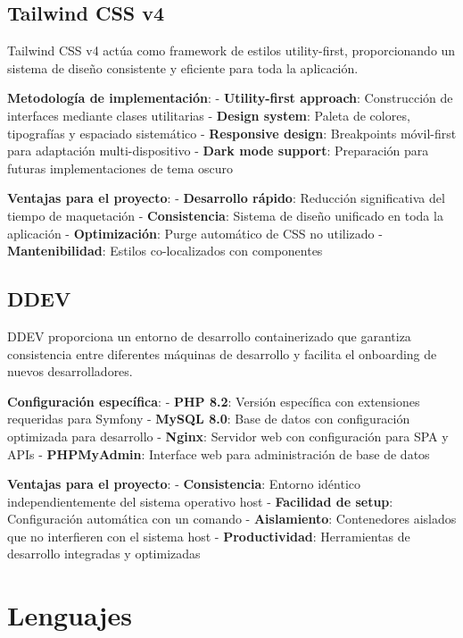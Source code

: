 \documentclass[12pt,a4paper,oneside]{report}
\begin{document}
\subsection{Tailwind CSS v4}\label{tailwind-css-v4}

Tailwind CSS v4 actúa como framework de estilos utility-first,
proporcionando un sistema de diseño consistente y eficiente para toda la
aplicación.

\textbf{Metodología de implementación}: - \textbf{Utility-first
approach}: Construcción de interfaces mediante clases utilitarias -
\textbf{Design system}: Paleta de colores, tipografías y espaciado
sistemático - \textbf{Responsive design}: Breakpoints móvil-first para
adaptación multi-dispositivo - \textbf{Dark mode support}: Preparación
para futuras implementaciones de tema oscuro

\textbf{Ventajas para el proyecto}: - \textbf{Desarrollo rápido}:
Reducción significativa del tiempo de maquetación -
\textbf{Consistencia}: Sistema de diseño unificado en toda la aplicación
- \textbf{Optimización}: Purge automático de CSS no utilizado -
\textbf{Mantenibilidad}: Estilos co-localizados con componentes

\subsection{DDEV}\label{ddev}

DDEV proporciona un entorno de desarrollo containerizado que garantiza
consistencia entre diferentes máquinas de desarrollo y facilita el
onboarding de nuevos desarrolladores.

\textbf{Configuración específica}: - \textbf{PHP 8.2}: Versión
específica con extensiones requeridas para Symfony - \textbf{MySQL 8.0}:
Base de datos con configuración optimizada para desarrollo -
\textbf{Nginx}: Servidor web con configuración para SPA y APIs -
\textbf{PHPMyAdmin}: Interface web para administración de base de datos

\textbf{Ventajas para el proyecto}: - \textbf{Consistencia}: Entorno
idéntico independientemente del sistema operativo host -
\textbf{Facilidad de setup}: Configuración automática con un comando -
\textbf{Aislamiento}: Contenedores aislados que no interfieren con el
sistema host - \textbf{Productividad}: Herramientas de desarrollo
integradas y optimizadas

\section{Lenguajes}\label{lenguajes}
\end{document}
